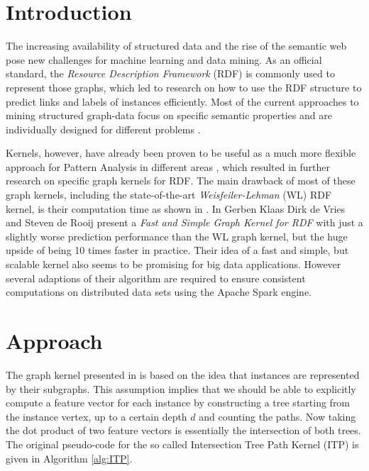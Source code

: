 \documentclass{easychair}
\begin{document}
\setcounter{tocdepth}{2}
\pagestyle{empty}

\section{Introduction}
\label{sect:Introduction}
The increasing availability of structured data and the rise of the semantic web pose new challenges for machine learning and data mining. As an official standard, the \textit{Resource Description Framework} (RDF) is commonly used to represent those graphs, which led to research on how to use the RDF structure to predict links and labels of instances efficiently. Most of the current approaches to mining structured graph-data focus on specific semantic properties and are individually designed for different problems \cite{Rettinger2009, Huang2011}.

Kernels, however, have already been proven to be useful as a much more flexible approach for Pattern Analysis in different areas \cite{Shawe-Taylor2004}, which resulted in further research on specific graph kernels for RDF. The main drawback of most of these graph kernels, including the state-of-the-art \textit{Weisfeiler-Lehman} (WL) RDF kernel, is their computation time as shown in \cite{deVries2013}. In \cite{FGK} Gerben Klaas Dirk de Vries and Steven de Rooij present a \textit{Fast and Simple Graph Kernel for RDF} with just a slightly worse prediction performance than the WL graph kernel, but the huge upside of being 10 times faster in practice. Their idea of a fast and simple, but scalable kernel also seems to be promising for big data applications. However several adaptions of their algorithm are required to ensure consistent computations on distributed data sets using the Apache Spark engine.

\section{Approach}
\label{sect:Approach}

The graph kernel presented in \cite{FGK} is based on the idea that instances are represented by their subgraphs. This assumption implies that we should be able to explicitly compute a feature vector for each instance by constructing a tree starting from the instance vertex, up to a certain depth $d$ and counting the paths. Now taking the dot product of two feature vectors is essentially the intersection of both trees. The original pseudo-code for the so called Intersection Tree Path Kernel (ITP) is given in Algorithm \ref{alg:ITP}.
\end{document}
